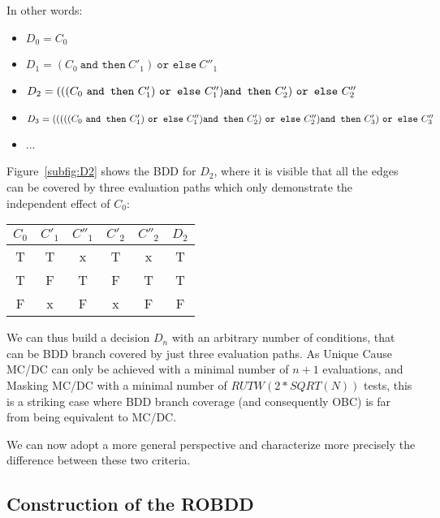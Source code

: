\documentclass[a4paper,12pt,twoside]{article}
\newcommand{\andthen}{\texttt{and then}}
\newcommand{\orelse}{\texttt{or else}}
\begin{document}
In other words:
\begin{itemize}
\item $D_{0} = C_{0}$
\item $D_{1} = (C_{0} \ \andthen{} \ C'_{1}) \ \orelse{} \ C''_{1}$
\item $D_{2} = (((C_{0} \ \andthen{} \ C'_{1}) \ \orelse{} \ C''_{1})\\
                 \andthen{} \ C'_{2}) \ \orelse{} \ C''_{2}$
\item $D_{3} = (((((C_{0} \ \andthen{} \ C'_{1}) \ \orelse{} \ C''_{1})\\
                 \andthen{} \ C'_{2}) \ \orelse{} \ C''_{2})\\
                   \andthen{} \ C'_{3}) \ \orelse{} \ C''_{3}$
\item ...
\end{itemize}

Figure~\ref{subfig:D2} shows the BDD for $D_{2}$, where it is visible
that all the edges can be covered by three evaluation paths which only
demonstrate the independent effect of $C_{0}$:

\begin{center}
\begin{tabular}{|c|c|c|c|c||c|}
\hline
$C_{0}$   & $C'_{1}$   & $C''_{1}$   & $C'_{2}$   & $C''_{2}$   & $D_{2}$ \\ \hline
T      & T       & x        & T       & x        & T     \\ \hline
T      & F       & T        & F       & T        & T     \\ \hline
F      & x       & F        & x       & F        & F     \\ \hline
\end{tabular}
\end{center}

We can thus build a decision $D_{n}$ with an arbitrary number of
conditions, that can be BDD branch covered by just three evaluation
paths. As Unique Cause MC/DC can only be achieved with a minimal
number of $n+1$ evaluations, and Masking MC/DC with a minimal number
of $RUTW(2*SQRT(N))$ tests, this is a striking case where BDD branch
coverage (and consequently OBC) is far from being equivalent to MC/DC.

We can now adopt a more general perspective and characterize more
precisely the difference between these two criteria.

\subsection{Construction of the ROBDD}
\end{document}
